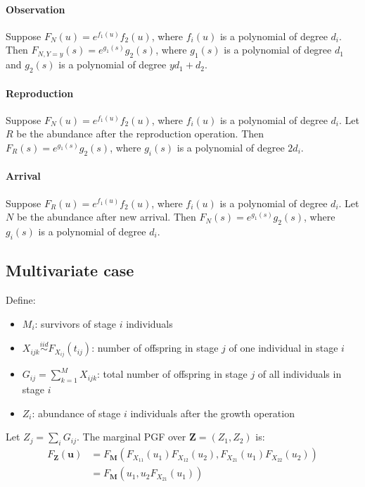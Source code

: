 \documentclass{article}
\begin{document}
\paragraph{Observation}
Suppose $F_N(u) = e^{f_1(u)}f_2(u)$, where $f_i(u)$ is a polynomial of degree $d_i$. Then $F_{N, Y=y}(s) = e^{g_1(s)}g_2(s)$, where $g_1(s)$ is a polynomial of degree $d_1$ and $g_2(s)$ is a polynomial of degree $yd_1+d_2$.

\paragraph{Reproduction}
Suppose $F_N(u) = e^{f_1(u)}f_2(u)$, where $f_i(u)$ is a polynomial of degree $d_i$. Let $R$ be the abundance after the reproduction operation. Then $F_R(s) = e^{g_1(s)}g_2(s)$, where $g_i(s)$ is a polynomial of degree $2d_i$.

\paragraph{Arrival}
Suppose $F_R(u) = e^{f_1(u)}f_2(u)$, where $f_i(u)$ is a polynomial of degree $d_i$. Let $N$ be the abundance after new arrival. Then $F_N(s) = e^{g_1(s)}g_2(s)$, where $g_i(s)$ is a polynomial of degree $d_i$.

\subsection{Multivariate case}
Define:
\begin{itemize}
\item $M_i$: survivors of stage $i$ individuals
\item $X_{ijk} \stackrel{iid}{\sim} F_{X_{ij}}(t_{ij})$: number of offspring in stage $j$ of one individual in stage $i$
\item $G_{ij} = \sum_{k=1}^M X_{ijk}$: total number of offspring in stage $j$ of all individuals in stage $i$
\item $Z_i$: abundance of stage $i$ individuals after the growth operation
\end{itemize}

Let $Z_j = \sum_i G_{ij}$. The marginal PGF over $\mathbf{Z} = (Z_1, Z_2)$ is:
\begin{align*}
F_{\mathbf{Z}}(\mathbf{u})
&= F_{\mathbf{M}}(F_{X_{11}}(u_1) F_{X_{12}}(u_2), F_{X_{21}}(u_1) F_{X_{22}}(u_2)) \\
&= F_{\mathbf{M}}(u_1, u_2 F_{X_{21}}(u_1))
\end{align*}
\end{document}

